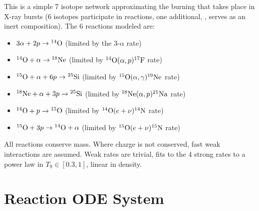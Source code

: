 This is a simple 7 isotope network approximating the burning that
takes place in X-ray bursts (6 isotopes participate in reactions, one
additional, , serves as an inert composition).  The 6 reactions
modeled are:
\begin{itemize}
\item $3\alpha + 2p \rightarrow \isotm{O}{14}$  (limited by the 3-$\alpha$ rate)

\item $\isotm{O}{14} + \alpha \rightarrow \isotm{Ne}{18}$
  (limited by $\isotm{O}{14}(\alpha,p)\isotm{F}{17}$ rate)

\item $\isotm{O}{15} + \alpha + 6 p \rightarrow \isotm{Si}{25}$
  (limited by $\isotm{O}{15}(\alpha,\gamma)\isotm{Ne}{19}$ rate)

\item $\isotm{Ne}{18} + \alpha + 3p \rightarrow \isotm{Si}{25}$
  (limited by $\isotm{Ne}{18}(\alpha,p)\isotm{Na}{21}$ rate)

\item $\isotm{O}{14} + p \rightarrow \isotm{O}{15}$
  (limited by $\isotm{O}{14}(e+\nu)\isotm{N}{14}$ rate)

\item $\isotm{O}{15} + 3p \rightarrow \isotm{O}{14} + \alpha$
  (limited by $\isotm{O}{15}(e+\nu)\isotm{N}{15}$ rate)
\end{itemize}
All reactions conserve mass.  Where charge is not conserved, fast weak
interactions are assumed.  Weak rates are trivial, fits to the 4
strong rates to a power law in $T_9 \in [0.3, 1]$, linear in density.



\section{Reaction ODE System}

